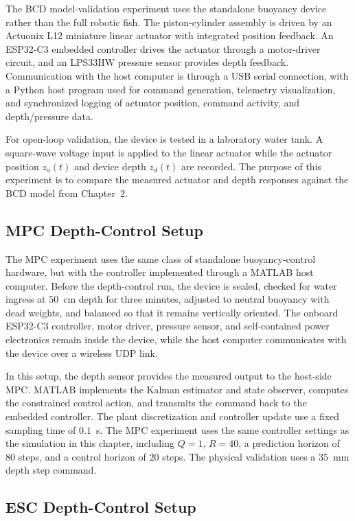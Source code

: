 \documentclass{uhcoethesis}
\begin{document}
The BCD model-validation experiment uses the standalone buoyancy device rather than the full robotic fish. The piston-cylinder assembly is driven by an Actuonix L12 miniature linear actuator with integrated position feedback. An ESP32-C3 embedded controller drives the actuator through a motor-driver circuit, and an LPS33HW pressure sensor provides depth feedback. Communication with the host computer is through a USB serial connection, with a Python host program used for command generation, telemetry visualization, and synchronized logging of actuator position, command activity, and depth/pressure data.

For open-loop validation, the device is tested in a laboratory water tank. A square-wave voltage input is applied to the linear actuator while the actuator position $z_a(t)$ and device depth $z_d(t)$ are recorded. The purpose of this experiment is to compare the measured actuator and depth responses against the BCD model from Chapter~2.

\subsection{MPC Depth-Control Setup}
\label{sec:ch3_mpc_experimental_setup}

The MPC experiment uses the same class of standalone buoyancy-control hardware, but with the controller implemented through a MATLAB host computer. Before the depth-control run, the device is sealed, checked for water ingress at $50$~cm depth for three minutes, adjusted to neutral buoyancy with dead weights, and balanced so that it remains vertically oriented. The onboard ESP32-C3 controller, motor driver, pressure sensor, and self-contained power electronics remain inside the device, while the host computer communicates with the device over a wireless UDP link.

In this setup, the depth sensor provides the measured output to the host-side MPC. MATLAB implements the Kalman estimator and state observer, computes the constrained control action, and transmits the command back to the embedded controller. The plant discretization and controller update use a fixed sampling time of $0.1$~s. The MPC experiment uses the same controller settings as the simulation in this chapter, including $Q=1$, $R=40$, a prediction horizon of $80$ steps, and a control horizon of $20$ steps. The physical validation uses a $35$~mm depth step command.

\subsection{ESC Depth-Control Setup}
\label{sec:ch3_esc_experimental_setup}
\end{document}
